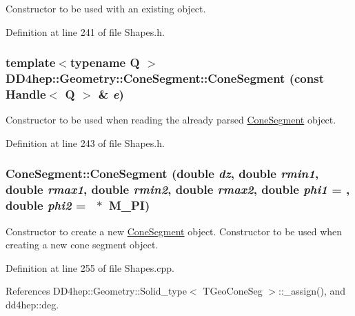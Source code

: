 Constructor to be used with an existing object. 

Definition at line 241 of file Shapes.h.\hypertarget{class_d_d4hep_1_1_geometry_1_1_cone_segment_a49916c0fcebe19754bde6cfc2df4e5d5}{
\subsubsection[{ConeSegment}]{\setlength{\rightskip}{0pt plus 5cm}template$<$typename Q $>$ DD4hep::Geometry::ConeSegment::ConeSegment (const {\bf Handle}$<$ Q $>$ \& {\em e})}}
\label{class_d_d4hep_1_1_geometry_1_1_cone_segment_a49916c0fcebe19754bde6cfc2df4e5d5}


Constructor to be used when reading the already parsed \hyperlink{class_d_d4hep_1_1_geometry_1_1_cone_segment}{ConeSegment} object. 

Definition at line 243 of file Shapes.h.\hypertarget{class_d_d4hep_1_1_geometry_1_1_cone_segment_a678511761af3275a6f07099fd0b7854f}{
\subsubsection[{ConeSegment}]{\setlength{\rightskip}{0pt plus 5cm}ConeSegment::ConeSegment (double {\em dz}, \/  double {\em rmin1}, \/  double {\em rmax1}, \/  double {\em rmin2}, \/  double {\em rmax2}, \/  double {\em phi1} = {}, \/  double {\em phi2} = {~$\ast$~M\_\-PI})}}
\label{class_d_d4hep_1_1_geometry_1_1_cone_segment_a678511761af3275a6f07099fd0b7854f}


Constructor to create a new \hyperlink{class_d_d4hep_1_1_geometry_1_1_cone_segment}{ConeSegment} object. Constructor to be used when creating a new cone segment object. 

Definition at line 255 of file Shapes.cpp.

References DD4hep::Geometry::Solid\_\-type$<$ TGeoConeSeg $>$::\_\-assign(), and dd4hep::deg.

